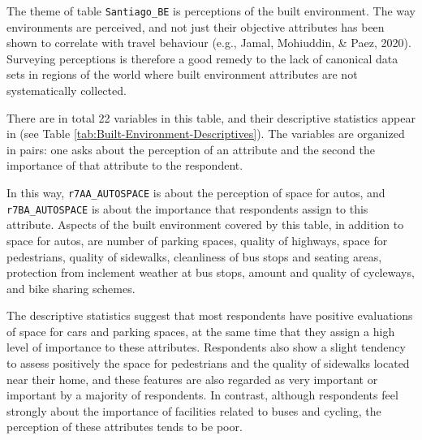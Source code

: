 \documentclass[
11pt, %
oneside, %
english, %
singlespacing, %
]{macthesis} %
\begin{document}
The theme of table \texttt{Santiago\_BE} is perceptions of the built environment. The way environments are perceived, and not just their objective attributes has been shown to correlate with travel behaviour (e.g., Jamal, Mohiuddin, \& Paez, 2020). Surveying perceptions is therefore a good remedy to the lack of canonical data sets in regions of the world where built environment attributes are not systematically collected.

There are in total 22 variables in this table, and their descriptive statistics appear in (see Table \ref{tab:Built-Environment-Descriptives}). The variables are organized in pairs: one asks about the perception of an attribute and the second the importance of that attribute to the respondent.

In this way, \texttt{r7AA\_AUTOSPACE} is about the perception of space for autos, and \texttt{r7BA\_AUTOSPACE} is about the importance that respondents assign to this attribute. Aspects of the built environment covered by this table, in addition to space for autos, are number of parking spaces, quality of highways, space for pedestrians, quality of sidewalks, cleanliness of bus stops and seating areas, protection from inclement weather at bus stops, amount and quality of cycleways, and bike sharing schemes.

The descriptive statistics suggest that most respondents have positive evaluations of space for cars and parking spaces, at the same time that they assign a high level of importance to these attributes. Respondents also show a slight tendency to assess positively the space for pedestrians and the quality of sidewalks located near their home, and these features are also regarded as very important or important by a majority of respondents. In contrast, although respondents feel strongly about the importance of facilities related to buses and cycling, the perception of these attributes tends to be poor.
\end{document}
